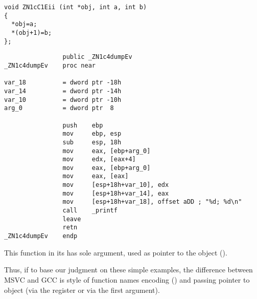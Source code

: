 \begin{lstlisting}
void ZN1cC1Eii (int *obj, int a, int b)
{
  *obj=a;
  *(obj+1)=b;
};
\end{lstlisting}



\begin{lstlisting}
                public _ZN1c4dumpEv
_ZN1c4dumpEv    proc near

var_18          = dword ptr -18h
var_14          = dword ptr -14h
var_10          = dword ptr -10h
arg_0           = dword ptr  8

                push    ebp
                mov     ebp, esp
                sub     esp, 18h
                mov     eax, [ebp+arg_0]
                mov     edx, [eax+4]
                mov     eax, [ebp+arg_0]
                mov     eax, [eax]
                mov     [esp+18h+var_10], edx
                mov     [esp+18h+var_14], eax
                mov     [esp+18h+var_18], offset aDD ; "%d; %d\n"
                call    _printf
                leave
                retn
_ZN1c4dumpEv    endp
\end{lstlisting}

{This function in its  has sole argument, 
used as pointer to the object ().}

{Thus, if to base our judgment on these simple examples, the difference between MSVC and GCC
is style of function names encoding () and passing pointer to object
(via the \ECX register or via the first argument).}
